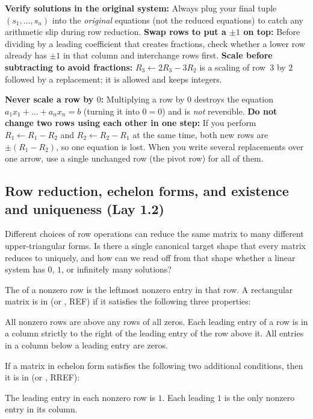 \documentclass[10pt]{scrartcl}
\begin{document}
\begin{shortcuts}
  \ii \textbf{Verify solutions in the original system:} Always plug your final tuple $(s_1,\dots,s_n)$ into the \emph{original} equations (not the reduced equations) to catch any arithmetic slip during row reduction.
  \ii \textbf{Swap rows to put a $\pm 1$ on top:} Before dividing by a leading coefficient that creates fractions, check whether a lower row already has $\pm 1$ in that column and interchange rows first.
  \ii \textbf{Scale before subtracting to avoid fractions:} $R_3\leftarrow 2R_3-3R_2$ is a scaling of row~3 by $2$ followed by a replacement; it is allowed and keeps integers.
\end{shortcuts}

\begin{trapbox}
  \ii \textbf{Never scale a row by $0$:} Multiplying a row by $0$ destroys the equation $a_1x_1+\dots+a_nx_n=b$ (turning it into $0=0$) and is \emph{not} reversible.
  \ii \textbf{Do not change two rows using each other in one step:} If you perform $R_1\leftarrow R_1-R_2$ and $R_2\leftarrow R_2-R_1$ at the same time, both new rows are $\pm(R_1-R_2)$, so one equation is lost. When you write several replacements over one arrow, use a single unchanged row (the pivot row) for all of them.
\end{trapbox}

\subsection{Row reduction, echelon forms, and existence and uniqueness (Lay 1.2)}

\begin{qbox}
  Different choices of row operations can reduce the same matrix to many different upper-triangular forms. Is there a single canonical target shape that every matrix reduces to uniquely, and how can we read off from that shape whether a linear system has $0$, $1$, or infinitely many solutions?
\end{qbox}

\begin{definition*}
  The  of a nonzero row is the leftmost nonzero entry in that row. A rectangular matrix is in  (or , REF) if it satisfies the following three properties:
  \begin{enumerate}[(1)]
    \ii All nonzero rows are above any rows of all zeros.
    \ii Each leading entry of a row is in a column strictly to the right of the leading entry of the row above it.
    \ii All entries in a column below a leading entry are zeros.
  \end{enumerate}
  If a matrix in echelon form satisfies the following two additional conditions, then it is in  (or , RREF):
  \begin{enumerate}[(1),start=4]
    \ii The leading entry in each nonzero row is $1$.
    \ii Each leading $1$ is the only nonzero entry in its column.
  \end{enumerate}
\end{definition*}
\end{document}
